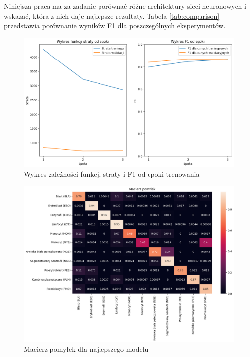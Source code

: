 Niniejsza praca ma za zadanie porównać różne architektury sieci neuronowych i wskazać, która z nich daje najlepsze rezultaty.
Tabela \ref{tab:comparison} przedstawia porównanie wyników F1 dla poszczególnych eksperymentów.

\begin{figure}
    \centering
    \includegraphics[width=\textwidth]{experiments/efficientnet_b0/combined}
    \caption{Wykres zależności funkcji straty i F1 od epoki trenowania}
    \label{fig:plot}
\end{figure}

\begin{figure}
    \centering
    \includegraphics[width=\textwidth]{experiments/efficientnet_b0/confusion_matrix}
    \caption{Macierz pomyłek dla najlepszego modelu}
    \label{fig:confusion_matrix}
\end{figure}

